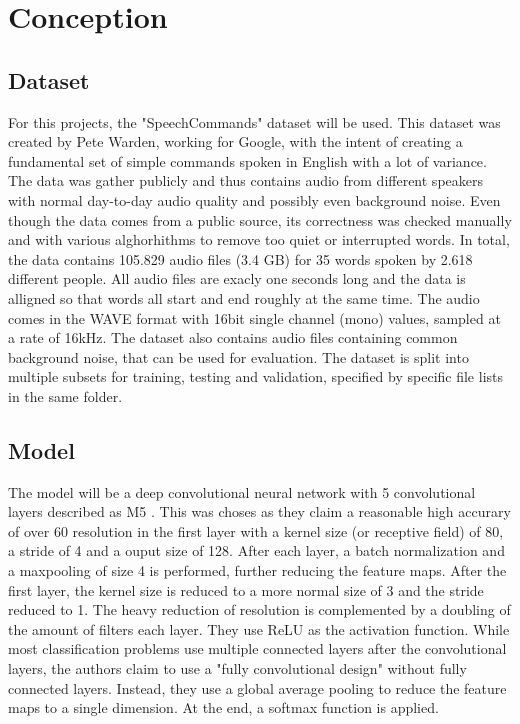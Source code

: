 \chapter{Conception}

\section{Dataset}
For this projects, the "SpeechCommands"\cite{warden2018speech} dataset will be used. This dataset was created by Pete Warden, 
working for Google, with the intent of creating a fundamental set of simple commands spoken in English with a lot of variance. 
The data was gather publicly and thus contains audio from different speakers with normal day-to-day audio quality and possibly even background noise. 
Even though the data comes from a public source, its correctness was checked manually and with various alghorhithms to remove too quiet or interrupted words. 
In total, the data contains 105.829 audio files (3.4 GB) for 35 words spoken by 2.618 different people. All audio files are exacly one seconds long and the data is alligned 
so that words all start and end roughly at the same time. The audio comes in the WAVE format with 16bit single channel (mono) values, sampled at a rate of 16kHz.
The dataset also contains audio files containing common background noise, that can be used for evaluation. The dataset is split into multiple subsets for 
training, testing and validation, specified by specific file lists in the same folder.

\section{Model} \label{model}
The model will be a deep convolutional neural network with 5 convolutional layers described as M5 \cite{dai2016deep}. This was choses as they claim a reasonable high accurary of
over 60%
resolution in the first layer with a kernel size (or receptive field) of 80, a stride of 4 and a ouput size of 128. After each layer, a batch normalization
and a maxpooling of size 4 is performed, further reducing the feature maps. After the first layer, the kernel size is reduced to a more normal size of 3 and the stride reduced to 1.
The heavy reduction of resolution is complemented by a doubling of the amount of filters each layer. They use ReLU as the activation function. While most classification
problems use multiple connected layers after the convolutional layers, the authors claim to use a "fully convolutional design" without fully connected layers. Instead, they
use a global average pooling to reduce the feature maps to a single dimension. At the end, a softmax function is applied.

